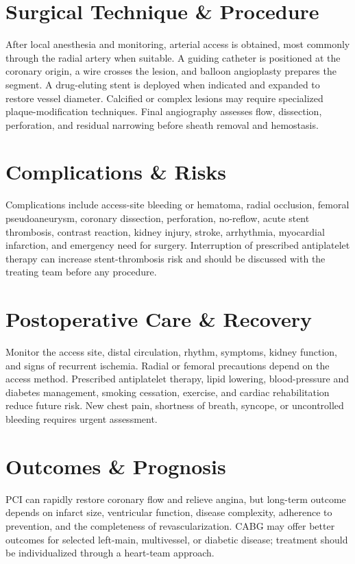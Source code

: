 \section*{Surgical Technique \& Procedure}
After local anesthesia and monitoring, arterial access is obtained, most commonly through the radial artery when suitable. A guiding catheter is positioned at the coronary origin, a wire crosses the lesion, and balloon angioplasty prepares the segment. A drug-eluting stent is deployed when indicated and expanded to restore vessel diameter. Calcified or complex lesions may require specialized plaque-modification techniques. Final angiography assesses flow, dissection, perforation, and residual narrowing before sheath removal and hemostasis.

\section*{Complications \& Risks}
Complications include access-site bleeding or hematoma, radial occlusion, femoral pseudoaneurysm, coronary dissection, perforation, no-reflow, acute stent thrombosis, contrast reaction, kidney injury, stroke, arrhythmia, myocardial infarction, and emergency need for surgery. Interruption of prescribed antiplatelet therapy can increase stent-thrombosis risk and should be discussed with the treating team before any procedure.

\section*{Postoperative Care \& Recovery}
Monitor the access site, distal circulation, rhythm, symptoms, kidney function, and signs of recurrent ischemia. Radial or femoral precautions depend on the access method. Prescribed antiplatelet therapy, lipid lowering, blood-pressure and diabetes management, smoking cessation, exercise, and cardiac rehabilitation reduce future risk. New chest pain, shortness of breath, syncope, or uncontrolled bleeding requires urgent assessment.

\section*{Outcomes \& Prognosis}
PCI can rapidly restore coronary flow and relieve angina, but long-term outcome depends on infarct size, ventricular function, disease complexity, adherence to prevention, and the completeness of revascularization. CABG may offer better outcomes for selected left-main, multivessel, or diabetic disease; treatment should be individualized through a heart-team approach.

